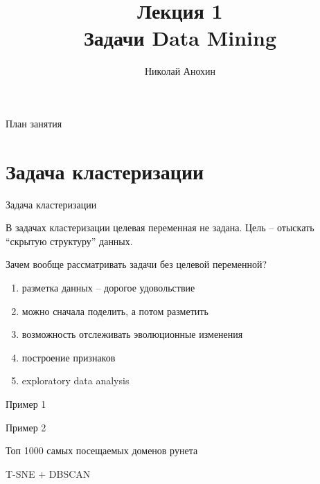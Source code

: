 \documentclass[10pt]{beamer}
\author{Николай Анохин}
\title{\newline \newline \newline Лекция 1 \\ Задачи Data Mining}
\let\otp\titlepage
\renewcommand{\titlepage}{\otp\addtocounter{framenumber}{-1}}
\begin{document}
\begin{frame}[plain]
\titlepage
\end{frame}

\begin{frame}{План занятия}
\tableofcontents
\end{frame}

\section{Задача кластеризации}

\begin{frame}{Задача кластеризации}

В задачах кластеризации целевая переменная не задана. Цель -- отыскать ``скрытую структуру'' данных.

\vspace{1em}
Зачем вообще рассматривать задачи без целевой переменной?
\begin{enumerate}
\item разметка данных -- дорогое удовольствие
\item можно сначала поделить, а потом разметить
\item возможность отслеживать эволюционные изменения
\item построение признаков
\item exploratory data analysis
\end{enumerate}

\end{frame}

\begin{frame}{Пример 1}

\end{frame}

\begin{frame}{Пример 2}

\end{frame}

\begin{frame}{Топ 1000 самых посещаемых доменов рунета}

T-SNE + DBSCAN

\end{frame}
\end{document}
